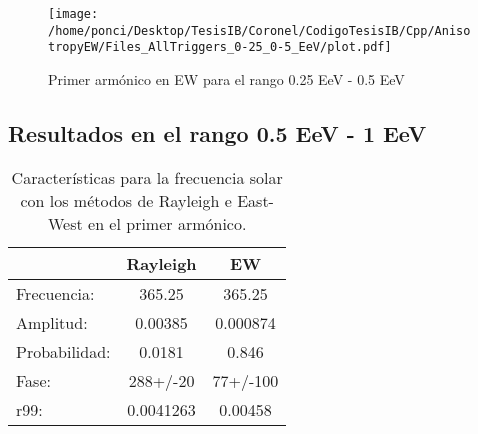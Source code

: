 \begin{figure}[H]
    \begin{small}
        \begin{center}
            \texttt{[image: /home/ponci/Desktop/TesisIB/Coronel/CodigoTesisIB/Cpp/AnisotropyEW/Files\_AllTriggers\_0-25\_0-5\_EeV/plot.pdf]}
        \end{center}
        \caption{Primer armónico en EW para el rango 0.25 EeV - 0.5 EeV}
        \label{fig:}
    \end{small}
\end{figure}


\subsection*{Resultados en el rango 0.5 EeV - 1 EeV}
\begin{table}[H]
    \begin{small}
        \begin{center}
            \begin{tabular}[c]{l|c|c}
                                & Rayleigh      & EW            \\\hline
                Frecuencia:     & 365.25	    & 365.25         \\
                Amplitud:       & 0.00385       & 0.000874    \\
                Probabilidad:   & 0.0181        & 0.846     \\
                Fase:           & 288+/-20      & 77+/-100           \\
                r99:            & 0.0041263     & 0.00458  \\
            \end{tabular}
        \end{center}
    \end{small}
    \caption{Características para la frecuencia solar con los métodos de Rayleigh  e East-West en el primer armónico.}
    \label{tab:solar}
\end{table}

